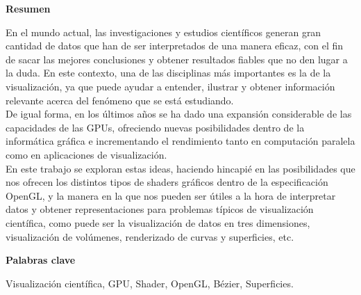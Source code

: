 
\newpage

\thispagestyle{empty}

\begin{center}

{\bf \Huge Resumen}

  \end{center} \vspace{1cm}

	En el mundo actual, las investigaciones y estudios científicos generan gran
	cantidad de datos que han de ser interpretados de una manera eficaz, con el
	fin de sacar las mejores conclusiones y obtener resultados fiables que no
	den lugar a la duda.  En este contexto, una de las disciplinas más
	importantes es la de la visualización, ya que puede ayudar a entender,
	ilustrar y obtener información relevante acerca del fenómeno que se está
	estudiando.\\

	De igual forma, en los últimos años se ha dado una expansión considerable de
	las capacidades de las GPUs, ofreciendo nuevas posibilidades dentro de
	la informática gráfica e incrementando el rendimiento tanto en computación
	paralela como en aplicaciones de visualización.\\
	
	En este trabajo se exploran estas ideas, haciendo hincapié en las
	posibilidades que nos ofrecen los distintos tipos de shaders gráficos dentro
	de la especificación OpenGL, y la manera en la que nos pueden ser útiles a
	la hora de interpretar datos y obtener representaciones para problemas
	típicos de visualización científica, como puede ser la visualización de
	datos en tres dimensiones, visualización de volúmenes, renderizado de curvas
	y superficies, etc.
	

\vspace{1cm}


\begin{center}

{\bf \Large Palabras clave}

   \end{center}

   \vspace{0.5cm}
   
   Visualización científica, GPU, Shader, OpenGL, Bézier, Superficies.
   



